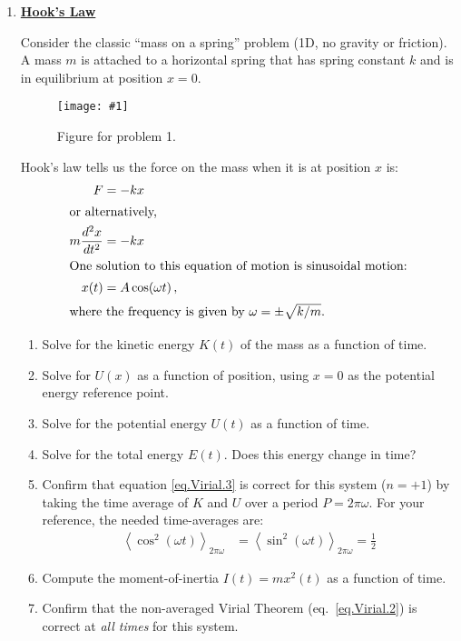 \documentclass[11pt]{article}
\newcommand\plotoneman[2]{\centering \leavevmode
  \texttt{[image: \#1]}}
\renewcommand{\section}[1]{\textbf{\underline{#1}}}
\begin{document}
\begin{enumerate}
\item \section{Hook's Law}
  
  Consider the classic ``mass on a spring'' problem (1D, no gravity or
  friction). A mass $m$ is attached to a horizontal spring that has
  spring constant $k$ and is in equilibrium at position $x=0$.

  \begin{figure*}[hbt]
    \plotoneman{spring}{0.3}
    \caption{Figure for problem 1.}
  \end{figure*}

  Hook's law tells us the force on the mass when it is at position
  $x$ is:
  \begin{align*}
    F&= -kx\, \\
    \intertext{or alternatively,}
    m \frac{d^2 x}{dt^2} &= - kx\\
    \intertext{One solution to this equation of motion is sinusoidal
      motion:}
    x(t) &= A \cos(\omega t)\,,\\
    \intertext{where the frequency is given by $\omega = \pm \sqrt{k /
      m}$.}
  \end{align*}

  \begin{enumerate}
  \item
    Solve for the kinetic energy $K(t)$ of the mass as a function of time.
  \item
    Solve for $U(x)$ as a function of position, using $x=0$ as the
    potential energy reference point.
  \item
    Solve for the potential energy $U(t)$ as a function of time.
  \item
    Solve for the total energy $E(t)$. Does this energy change in
    time?
  \item
    Confirm that equation \ref{eq.Virial.3} is correct for this system
    ($n=+1$) by taking the time average of $K$ and $U$ over a period
    $P = 2\pi\omega$. For your reference, the needed time-averages are:
    \begin{align*}
      \left<\cos^2(\omega t)\right>_{2\pi\omega} &=
      \left<\sin^2(\omega t)\right>_{2\pi\omega} = \frac{1}{2}
    \end{align*}
  \item
    Compute the moment-of-inertia $I(t) = m x^2(t)$ as a function of
    time.
  \item
    Confirm that the non-averaged Virial Theorem (eq.~\ref{eq.Virial.2})
    is correct at \textit{all times} for this system.
  \end{enumerate}


\end{enumerate}
\end{document}
